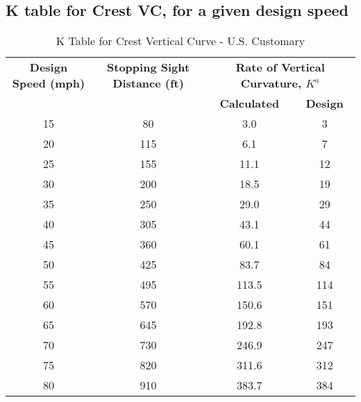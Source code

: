\documentclass{article}
\begin{document}
  \subsection{K table for Crest VC, for a given design speed}
  \begin{table}[h!]
  \centering
  \begin{tabular}{|c|c|c|c|}
  \hline
  \textbf{Design Speed (mph)} & \textbf{Stopping Sight Distance (ft)} & \multicolumn{2}{c|}{\textbf{Rate of Vertical Curvature, $K^a$}} \\ \cline{3-4} 
                              &                                       & \textbf{Calculated} & \textbf{Design} \\ \hline
  15                          & 80                                    & 3.0                 & 3               \\ \hline
  20                          & 115                                   & 6.1                 & 7               \\ \hline
  25                          & 155                                   & 11.1                & 12              \\ \hline
  30                          & 200                                   & 18.5                & 19              \\ \hline
  35                          & 250                                   & 29.0                & 29              \\ \hline
  40                          & 305                                   & 43.1                & 44              \\ \hline
  45                          & 360                                   & 60.1                & 61              \\ \hline
  50                          & 425                                   & 83.7                & 84              \\ \hline
  55                          & 495                                   & 113.5               & 114             \\ \hline
  60                          & 570                                   & 150.6               & 151             \\ \hline
  65                          & 645                                   & 192.8               & 193             \\ \hline
  70                          & 730                                   & 246.9               & 247             \\ \hline
  75                          & 820                                   & 311.6               & 312             \\ \hline
  80                          & 910                                   & 383.7               & 384             \\ \hline
  \end{tabular}
  \caption{K Table for Crest Vertical Curve - U.S. Customary}
  \end{table}
\end{document}
